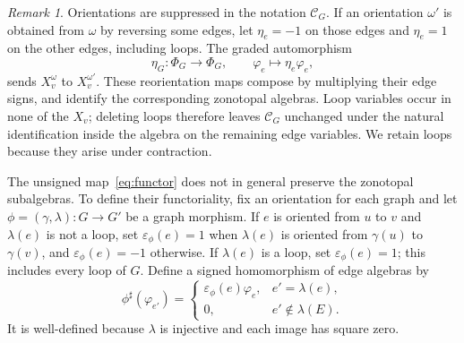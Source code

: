 \documentclass[reqno]{article}
\theoremstyle{plain} %
\theoremstyle{definition}
\theoremstyle{remark}
\newtheorem{remark}[theorem]{\sc Remark}
\newcommand {\CC}{\mathscr{C}}
\numberwithin{equation}{section}
\begin{document}
\begin{remark}\label{rem:orientations}
Orientations are suppressed in the notation $\CC_G$. If an orientation
$\omega'$ is obtained from $\omega$ by reversing some edges, let
$\eta_e=-1$ on those edges and $\eta_e=1$ on the other edges, including
loops. The graded automorphism
\[
\eta_G:\Phi_G\longrightarrow\Phi_G,\qquad
\varphi_e\longmapsto\eta_e\varphi_e,
\]
sends $X_v^\omega$ to $X_v^{\omega'}$. These reorientation maps compose
by multiplying their edge signs, and identify the corresponding
zonotopal algebras. Loop variables occur in none of the $X_v$; deleting
loops therefore leaves $\CC_G$ unchanged under the natural identification
inside the algebra on the remaining edge variables. We retain loops
because they arise under contraction.
\end{remark}

The unsigned map~\eqref{eq:functor} does not in general preserve the
zonotopal subalgebras. To define their functoriality, fix an orientation
for each graph and let $\phi=(\gamma,\lambda):G\to G'$ be a graph morphism.
If $e$ is oriented from $u$ to $v$ and $\lambda(e)$ is not a loop, set
$\varepsilon_\phi(e)=1$ when $\lambda(e)$ is oriented from $\gamma(u)$
to $\gamma(v)$, and $\varepsilon_\phi(e)=-1$ otherwise. If $\lambda(e)$
is a loop, set $\varepsilon_\phi(e)=1$; this includes every loop of $G$.
Define a signed homomorphism of edge algebras by
\begin{equation}\label{eq:signed-edge-pullback}
\phi^\sharp(\varphi_{e'})=
\begin{cases}
\varepsilon_\phi(e)\varphi_e,&e'=\lambda(e),\\
0,&e'\notin\lambda(E).
\end{cases}
\end{equation}
It is well-defined because $\lambda$ is injective and each image has
square zero.
\end{document}
